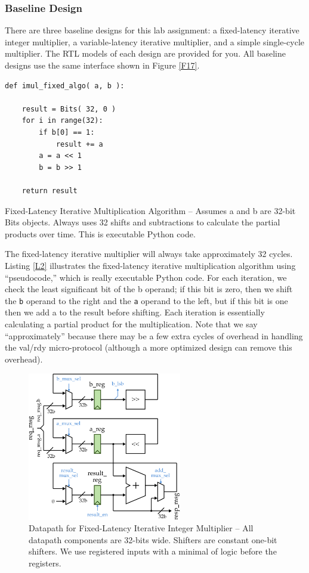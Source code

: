 \documentclass[a4paper,12pt,twoside]{article}
\begin{document}
\subsubsection{Baseline Design}
There are three baseline designs for this lab assignment: a fixed-latency iterative integer multiplier, a variable-latency iterative multiplier, and a simple single-cycle multiplier. The RTL models of each design are provided for you. All baseline designs use the same interface shown in Figure \ref{F17}.
\begin{listing}[H]
\begin{verbatim}
def imul_fixed_algo( a, b ):

    result = Bits( 32, 0 )
    for i in range(32):
        if b[0] == 1:
            result += a
        a = a << 1
        b = b >> 1
        
    return result
\end{verbatim}
\caption{Fixed-Latency Iterative Multiplication Algorithm – Assumes a and b are 32-bit Bits objects. Always uses 32 shifts and subtractions to calculate the partial products over time. This is executable Python code.}
\label{L2}
\end{listing}
The fixed-latency iterative multiplier will always take approximately 32 cycles. Listing \ref{L2} illustrates the fixed-latency iterative multiplication algorithm using “pseudocode,” which is really executable Python code. For each iteration, we check the least significant bit of the b operand; if this bit is zero, then we shift the \texttt{b} operand to the right and the \texttt{a} operand to the left, but if this bit is one then we add a to the result before shifting. Each iteration is essentially calculating a partial product for the multiplication. Note that we say “approximately” because there may be a few extra cycles of overhead in handling the val/rdy micro-protocol (although a more optimized design can remove this overhead).
\begin{figure}[H]
    \centering
    \includegraphics[width=0.6\textwidth]{images/18.png}
    \caption{Datapath for Fixed-Latency Iterative Integer Multiplier – All datapath components are 32-bits wide. Shifters are constant one-bit shifters. We use registered inputs with a minimal of logic before the registers.}
    \label{F18}
\end{figure}
\end{document}
